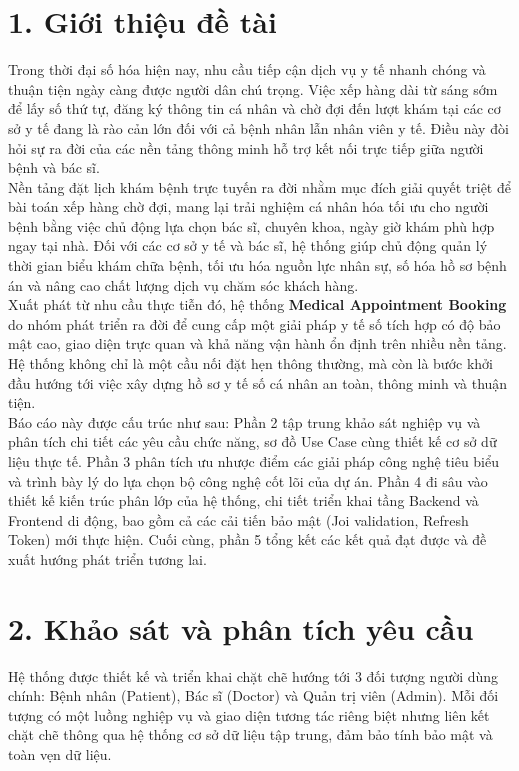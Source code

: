 \documentclass[12pt,a4paper]{report}
\begin{document}
\section*{1. Giới thiệu đề tài}
\hspace{1em} Trong thời đại số hóa hiện nay, nhu cầu tiếp cận dịch vụ y tế nhanh chóng và thuận tiện ngày càng được người dân chú trọng. Việc xếp hàng dài từ sáng sớm để lấy số thứ tự, đăng ký thông tin cá nhân và chờ đợi đến lượt khám tại các cơ sở y tế đang là rào cản lớn đối với cả bệnh nhân lẫn nhân viên y tế. Điều này đòi hỏi sự ra đời của các nền tảng thông minh hỗ trợ kết nối trực tiếp giữa người bệnh và bác sĩ.
\\[0.4cm]
\indent Nền tảng đặt lịch khám bệnh trực tuyến ra đời nhằm mục đích giải quyết triệt để bài toán xếp hàng chờ đợi, mang lại trải nghiệm cá nhân hóa tối ưu cho người bệnh bằng việc chủ động lựa chọn bác sĩ, chuyên khoa, ngày giờ khám phù hợp ngay tại nhà. Đối với các cơ sở y tế và bác sĩ, hệ thống giúp chủ động quản lý thời gian biểu khám chữa bệnh, tối ưu hóa nguồn lực nhân sự, số hóa hồ sơ bệnh án và nâng cao chất lượng dịch vụ chăm sóc khách hàng.
\\[0.4cm]
\indent Xuất phát từ nhu cầu thực tiễn đó, hệ thống \textbf{Medical Appointment Booking} do nhóm phát triển ra đời để cung cấp một giải pháp y tế số tích hợp có độ bảo mật cao, giao diện trực quan và khả năng vận hành ổn định trên nhiều nền tảng. Hệ thống không chỉ là một cầu nối đặt hẹn thông thường, mà còn là bước khởi đầu hướng tới việc xây dựng hồ sơ y tế số cá nhân an toàn, thông minh và thuận tiện.
\\[0.4cm]
\indent Báo cáo này được cấu trúc như sau: Phần 2 tập trung khảo sát nghiệp vụ và phân tích chi tiết các yêu cầu chức năng, sơ đồ Use Case cùng thiết kế cơ sở dữ liệu thực tế. Phần 3 phân tích ưu nhược điểm các giải pháp công nghệ tiêu biểu và trình bày lý do lựa chọn bộ công nghệ cốt lõi của dự án. Phần 4 đi sâu vào thiết kế kiến trúc phân lớp của hệ thống, chi tiết triển khai tầng Backend và Frontend di động, bao gồm cả các cải tiến bảo mật (Joi validation, Refresh Token) mới thực hiện. Cuối cùng, phần 5 tổng kết các kết quả đạt được và đề xuất hướng phát triển tương lai.

\newpage

\section*{2. Khảo sát và phân tích yêu cầu}
\hspace{1em} Hệ thống được thiết kế và triển khai chặt chẽ hướng tới 3 đối tượng người dùng chính: Bệnh nhân (Patient), Bác sĩ (Doctor) và Quản trị viên (Admin). Mỗi đối tượng có một luồng nghiệp vụ và giao diện tương tác riêng biệt nhưng liên kết chặt chẽ thông qua hệ thống cơ sở dữ liệu tập trung, đảm bảo tính bảo mật và toàn vẹn dữ liệu.
\end{document}
